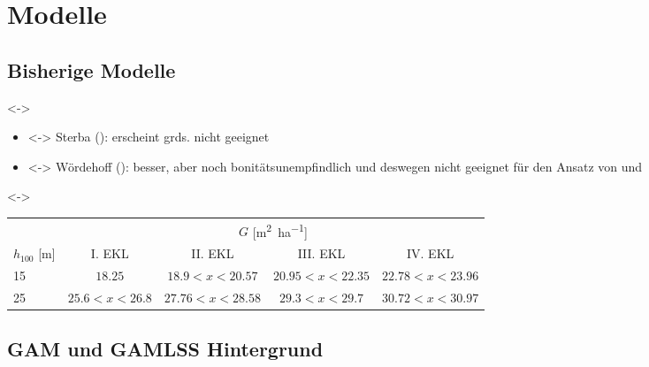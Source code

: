 \section{Modelle}

\subsection{Bisherige Modelle}
\begin{frame}[c]
  \visible<\theFirstElement->{
    \begin{itemize}
    \item<\theFirstElement-> Sterba (\Sterba{}): erscheint grds. nicht geeignet
    \item<\theSecondElement-> Wördehoff (\Woerdehoff{}): besser, aber noch bonitätsunempfindlich und deswegen nicht geeignet für den Ansatz von \DoebbelerSpellmann{} und \SpellmannEtAl{}
    \end{itemize}}

  \visible<\theSecondElement->{
    \begin{center}
      \begin{minipage}[t]{0.975\linewidth}
        {\scriptsize
          \begin{tabular}{l c c c c}
            \toprule
            & \multicolumn{4}{c}{\(G\) [\si{\square\meter\per\hectare}]} \\ \cline{2-5}
            \(h_{100}\) [\si{\meter}] & I. EKL & II. EKL & III. EKL & IV. EKL \\
            \midrule
            15 & \(18.25\) & \(18.9 < x < 20.57\) & \(20.95 < x < 22.35\) & \(22.78 < x < 23.96\) \\
            25 & \(25.6 < x < 26.8\) & \(27.76 < x < 28.58\) & \(29.3 < x < 29.7\) & \(30.72 < x < 30.97\) \\
            \bottomrule
          \end{tabular}}
      \end{minipage}
    \end{center}}
\end{frame}

\subsection{GAM und GAMLSS  \textendash{} Hintergrund}

